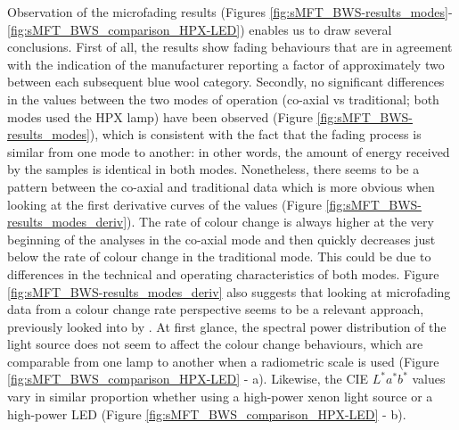 Observation of the microfading results (Figures \ref{fig:sMFT_BWS-results_modes}- \ref{fig:sMFT_BWS_comparison_HPX-LED}) enables us to draw several conclusions. First of all, the results show fading behaviours that are in agreement with the indication of the manufacturer reporting a factor of approximately two between each subsequent blue wool category. Secondly, no significant differences in the \dEOO values between the two modes of operation (co-axial vs traditional; both modes used the HPX lamp) have been observed (Figure \ref{fig:sMFT_BWS-results_modes}), which is consistent with the fact that the fading process is similar from one mode to another: in other words, the amount of energy received by the samples is identical in both modes. Nonetheless, there seems to be a pattern between the co-axial and traditional data which is more obvious when looking at the first derivative curves of the \dEOO values (Figure \ref{fig:sMFT_BWS-results_modes_deriv}). The rate of colour change is always higher at the very beginning of the analyses in the co-axial mode and then quickly decreases just below the rate of colour change in the traditional mode. This could be due to differences in the technical and operating characteristics of both modes. Figure \ref{fig:sMFT_BWS-results_modes_deriv} also suggests that looking at microfading data from a colour change rate perspective seems to be a relevant approach, previously looked into by \citet{prestel_classification_2017}. At first glance, the spectral power distribution of the light source does not seem to affect the colour change behaviours, which are comparable from one lamp to another when a radiometric scale is used (Figure \ref{fig:sMFT_BWS_comparison_HPX-LED} - a). Likewise, the CIE $L^*a^*b^*$ values vary in similar proportion whether using a high-power xenon light source or a high-power \gls{LED} (Figure \ref{fig:sMFT_BWS_comparison_HPX-LED} - b).\\




